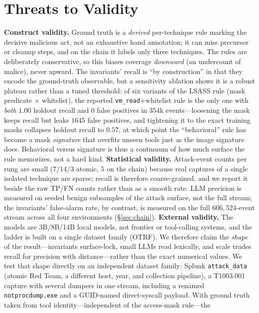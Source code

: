 \documentclass[sigconf,nonacm]{acmart}
\begin{document}
\section{Threats to Validity}
\label{sec:threats}
\textbf{Construct validity.} Ground truth is a \emph{derived} per-technique rule
marking the decisive malicious act, not an exhaustive hand annotation; it can
miss precursor or cleanup steps, and on the chain it labels only three
techniques. The rules are deliberately conservative, so this biases coverage
\emph{downward} (an undercount of malice), never upward. The invariants' recall
is ``by construction'' in that they encode the ground-truth observable, but a
sensitivity ablation shows it is a robust plateau rather than a tuned
threshold: of six variants of the LSASS rule (mask predicate $\times$ whitelist),
the reported \texttt{vm\_read}$+$whitelist rule is the only one with \emph{both}
$1.00$ holdout recall and $0$ false positives in $354$k events---loosening the
mask keeps recall but leaks $1645$ false positives, and tightening it to the
exact training masks collapses holdout recall to $0.57$, at which point the
``behavioral'' rule has become a mask \emph{signature} that overfits unseen tools
just as the image signature does. Behavioral versus signature is thus a
continuum of how much surface the rule memorizes, not a hard kind.
\textbf{Statistical validity.} Attack-event counts per rung are small ($7/14/3$ atomic, $5$ on the
chain) because real captures of a single isolated technique are sparse; recall is
therefore coarse-grained, and we report it beside the raw TP/FN counts rather
than as a smooth rate. LLM precision is measured on seeded benign subsamples of
the attack surface, not the full stream; the invariants' false-alarm rate, by
contrast, is measured on the full $606{,}524$-event stream across all four
environments (\S\ref{sec:chain}). \textbf{External validity.} The models
are 3B/8B/14B local models, not frontier or tool-calling systems, and the ladder
is built on a single dataset family (OTRF). We therefore claim the \emph{shape}
of the result---invariants surface-lock, small LLMs read lexically, and scale
trades recall for precision with distance---rather than the exact numerical
values. We test that shape directly on an independent dataset family: Splunk
\texttt{attack\_data} (atomic Red Team, a different host, year, and collection
pipeline), a T1003.001 capture with several dumpers in one stream, including a
renamed \texttt{notprocdump.exe} and a GUID-named direct-syscall payload. With
ground truth taken from tool identity---independent of the access-mask rule---the
\end{document}
